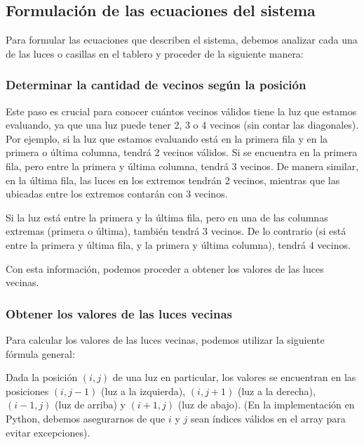 \documentclass{article}
\begin{document}
    \newpage

    \subsection{Formulación de las ecuaciones del sistema}

    Para formular las ecuaciones que describen el sistema, debemos analizar cada una de las luces o casillas en el tablero y proceder de la siguiente manera:
    
    \subsubsection*{Determinar la cantidad de vecinos según la posición}
    
    Este paso es crucial para conocer cuántos vecinos válidos tiene la luz que estamos evaluando, ya que una luz puede tener 2, 3 o 4 vecinos (sin contar las diagonales). Por ejemplo, si la luz que estamos evaluando está en la primera fila y en la primera o última columna, tendrá 2 vecinos válidos. Si se encuentra en la primera fila, pero entre la primera y última columna, tendrá 3 vecinos. De manera similar, en la última fila, las luces en los extremos tendrán 2 vecinos, mientras que las ubicadas entre los extremos contarán con 3 vecinos.
    
    Si la luz está entre la primera y la última fila, pero en una de las columnas extremas (primera o última), también tendrá 3 vecinos. De lo contrario (si está entre la primera y última fila, y la primera y última columna), tendrá 4 vecinos.
    
    Con esta información, podemos proceder a obtener los valores de las luces vecinas.
    
    \subsubsection*{Obtener los valores de las luces vecinas}
    
    Para calcular los valores de las luces vecinas, podemos utilizar la siguiente fórmula general:
    
    Dada la posición $(i,j)$ de una luz en particular, los valores se encuentran en las posiciones $(i,j-1)$ (luz a la izquierda), $(i,j+1)$ (luz a la derecha), $(i-1,j)$ (luz de arriba) y $(i+1,j)$ (luz de abajo). (En la implementación en Python, debemos asegurarnos de que $i$ y $j$ sean índices válidos en el array para evitar excepciones).
    
\end{document}
